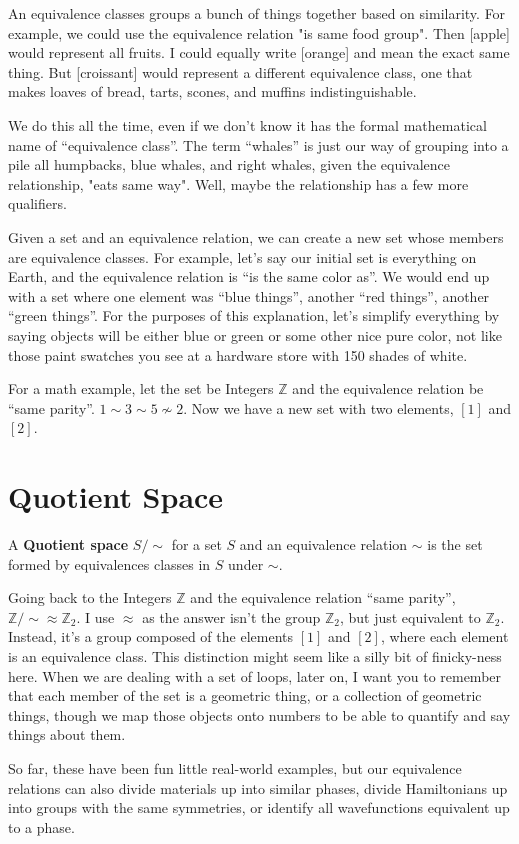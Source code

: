 An equivalence classes groups a bunch of things together based on similarity.  For example, we could use the equivalence relation "is same food group".  Then [apple] would represent all fruits.  I could equally write [orange] and mean the exact same thing.  But [croissant] would represent a different equivalence class, one that makes loaves of bread, tarts, scones, and muffins indistinguishable.

We do this all the time, even if we don't know it has the formal mathematical name of ``equivalence class''.  The term ``whales'' is just our way of grouping into a pile all humpbacks, blue whales, and right whales, given the equivalence relationship, "eats same way".  Well, maybe the relationship has a few more qualifiers.

Given a set and an equivalence relation, we can create a new set whose members are equivalence classes.  For example, let's say our initial set is everything on Earth, and the equivalence relation is ``is the same color as''.  We would end up with a set where one element was ``blue things'', another ``red things'', another ``green things''.  For the purposes of this explanation, let's simplify everything by saying objects will be either blue or green or some other nice pure color, not like those paint swatches you see at a hardware store with 150 shades of white.

For a math example, let the set be Integers $\mathbb{Z}$ and the equivalence relation be ``same parity''.  $1 \sim 3 \sim 5 \nsim 2$.  Now we have a new set with two elements, $[1]$ and $[2]$.

\section{Quotient Space}

\begin{definition}
  A \textbf{Quotient space} $S/\sim$ for a set $S$ and an equivalence relation $\sim$ is the set formed by equivalences classes in $S$ under $\sim$.
\end{definition}

Going back to the Integers $\mathbb{Z}$ and the equivalence relation ``same parity'', $\mathbb{Z}/ \sim  \approx \mathbb{Z}_2$.  I use $\approx$ as the answer isn't the group $\mathbb{Z}_2$, but just equivalent to $\mathbb{Z}_2$.  Instead, it's a group composed of the elements $[1]$ and $[2]$, where each element is an equivalence class.  This distinction might seem like a silly bit of finicky-ness here. When we are dealing with a set of loops, later on, I want you to remember that each member of the set is a geometric thing, or a collection of geometric things, though we map those objects onto numbers to be able to quantify and say things about them.




So far, these have been fun little real-world examples, but our equivalence relations can also divide materials up into similar phases, divide Hamiltonians up into groups with the same symmetries, or identify all wavefunctions equivalent up to a phase.
